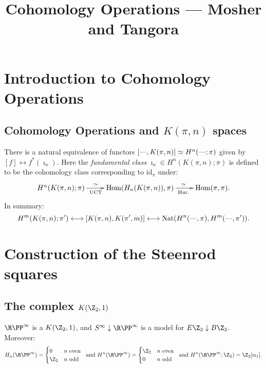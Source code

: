 \documentclass[11pt]{article}
\title{Cohomology Operations\small{ --- Mosher and Tangora}}
\author{}
\date{}
\begin{document}

\section{Introduction to Cohomology Operations}
\subsection{Cohomology Operations and \texorpdfstring{$K(\pi,n)$}{K(G,n)} spaces}
There is a natural equivalence of functors $[\textup{---},K(\pi,n)]\simeq H^n(\textup{---};\pi)$ given by $[f]\longleftrightarrow f^*(\imath_n)$. Here the \emph{fundamental class} $\imath_n\in H^n(K(\pi,n);\pi)$ is defined to be the cohomology class corresponding to $\text{id}_\pi$ under:
\[\xymatrix{
H^n(K(\pi,n);\pi)\ar[r]^{\simeq\ \ \ \ }_{\textup{UCT}\ \ \ \ }&\Hom(H_n(K(\pi,n)),\pi)\ar[r]_{\ \ \ \ \ \ \text{Hur.}}^{\ \ \ \ \ \ \simeq}&\Hom(\pi,\pi).
}\]
In summary:
\[H^m(K(\pi,n);\pi')\longleftrightarrow [K(\pi,n),K(\pi',m)]\longleftrightarrow \textup{Nat}( H^n(\textup{---},\pi), H^{m}(\textup{---},\pi')).\]



\section{Construction of the Steenrod squares}
\subsection{The complex \texorpdfstring{$K(\Z_2,1)$}{K(Z/2,1)}}
$\RP^\infty$ is a $K(\Z_2,1)$, and $S^\infty\downarrow\RP^\infty$ is a model for $E\Z_2\downarrow B\Z_2$. Moreover:
\[H_n(\RP^\infty)=\begin{cases}0&n\text{ even}\\\Z_2&n\text{ odd}\end{cases}\ \text{ and }H^n(\RP^\infty)=\begin{cases}\Z_2&n\text{ even}\\0&n\text{ odd}\end{cases}\ \text{ and }H^n(\RP^\infty;\Z_2)=\Z_2[\alpha_1].\]
\end{document}
